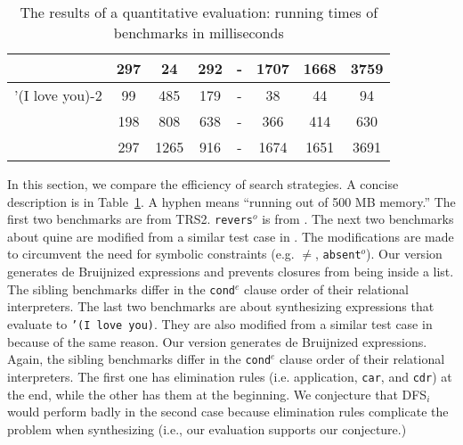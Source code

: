 \documentclass[format=acmlarge, review=true, authordraft=true]{acmart}
\newcommand{\conde}{\texttt{cond$^e$}}
\newcommand{\reverso}{\texttt{revers$^o$}}
\newcommand{\DFSi }[0]{DFS$_{i}$}
\begin{document}
\begin{table}
\begin{tabular}{|c|c|c|c|c|c|c|c|}
						& 297 &  24 & 292 & - & 1707 & 1668 & 3759 \\
		\hline
		'(I love you)-2 &  99 & 485 & 179 & - &   38 &   44 &   94 \\
						& 198 & 808 & 638 & - &  366 &  414 &  630 \\
						& 297 &1265 & 916 & - & 1674 & 1651 & 3691 \\ 
		\hline 
	\end{tabular}
	\caption{The results of a quantitative evaluation: running times of 
	benchmarks in milliseconds}
	\label{compare-efficiency}
\end{table}

In this section, we compare the efficiency of search strategies. A concise 
description is in Table~\ref{compare-efficiency}. A hyphen means ``running out
of 500 MB memory.'' The first two benchmarks are from 
TRS2. \reverso{} is from 
\citet{rozplokhas2018improving}. 
The next two benchmarks about quine are modified from a similar test case in 
\citet{byrd2017unified}. The modifications are made to circumvent the need for 
symbolic constraints (e.g. $\neq$, \texttt{absent$^o$}).
Our version generates de Bruijnized expressions and prevents closures from 
being inside a list. 
The sibling benchmarks differ in the \conde{} clause order of their relational 
interpreters.
The last two benchmarks are about synthesizing expressions that evaluate to 
\texttt{'(I love you)}. 
They are also modified from a similar test case in \citet{byrd2017unified} 
because of the same reason. 
Our version generates de Bruijnized expressions. 
Again, the sibling benchmarks differ in the \conde{} clause order of their 
relational interpreters. The first one has elimination rules (i.e. application, 
\texttt{car}, and \texttt{cdr}) at the end, while the other has them at the 
beginning. 
We conjecture that \DFSi{} would perform badly in the second case because 
elimination rules complicate the problem when synthesizing (i.e., our 
evaluation supports our conjecture.)
\end{document}
